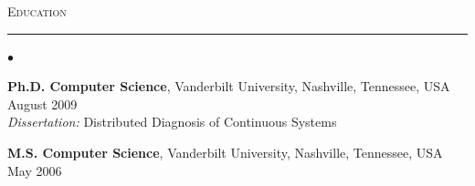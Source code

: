 \textsc{\Large{Education}}
\vspace{3pt}
\hrule
\begin{list}{$\bullet$}{ \itemsep -0.01in}
\item \textbf{Ph.D. Computer Science}, Vanderbilt University, Nashville, Tennessee, USA  \hfill August 2009 \\
\emph{Dissertation:} Distributed Diagnosis of Continuous Systems
\item \textbf{M.S. Computer Science}, Vanderbilt University, Nashville, Tennessee, USA  \hfill May 2006
\end{list}
